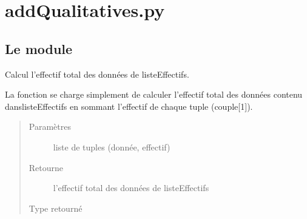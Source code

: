 \documentclass[letterpaper,10pt,openany,oneside,french]{sphinxmanual}
\begin{document}
\chapter{addQualitatives.py}
\label{\detokenize{addQualitatives:addqualitatives-py}}\label{\detokenize{addQualitatives::doc}}\label{\detokenize{addQualitatives:module-add.addQualitatives}}

\section{Le module }
\label{\detokenize{addQualitatives:le-module-analyse-de-donnees-qualitatives}}

\begin{fulllineitems}
\label{\detokenize{addQualitatives:add.addQualitatives.nbElemListeCouple}}
Calcul l’effectif total des données de listeEffectifs.

La fonction se charge simplement de calculer l’effectif total des données contenu danslisteEffectifs en sommant 
l’effectif de chaque tuple (couple{[}1{]}).
\begin{quote}\begin{description}
\item[{Paramètres}] \leavevmode
{} \textendash{} liste de tuples (donnée, effectif)

\item[{Retourne}] \leavevmode
l’effectif total des données de listeEffectifs

\item[{Type retourné}] \leavevmode
{}

\end{description}\end{quote}

\end{fulllineitems}

\end{document}
